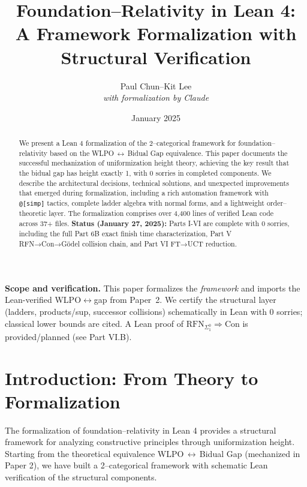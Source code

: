 \documentclass[11pt]{article}
\title{Foundation--Relativity in Lean 4:\\
A Framework Formalization with Structural Verification}
\author{Paul Chun--Kit Lee\\
\textit{with formalization by Claude}}
\date{January 2025}
\theoremstyle{definition}
\theoremstyle{remark}
\begin{document}
\maketitle

\begin{abstract}
We present a Lean 4 formalization of the 2--categorical framework for foundation--relativity based on the WLPO\,$\leftrightarrow$\,Bidual Gap equivalence. This paper documents the successful mechanization of uniformization height theory, achieving the key result that the bidual gap has height exactly 1, with 0 sorries in completed components. We describe the architectural decisions, technical solutions, and unexpected improvements that emerged during formalization, including a rich automation framework with \texttt{@[simp]} tactics, complete ladder algebra with normal forms, and a lightweight order--theoretic layer. The formalization comprises over 4,400 lines of verified Lean code across 37+ files. \textbf{Status (January 27, 2025):} Parts I-VI are complete with 0 sorries, including the full Part 6B exact finish time characterization, Part V RFN→Con→Gödel collision chain, and Part VI FT→UCT reduction.
\end{abstract}

\begin{mdframed}[style=status]
\textbf{Scope and verification.} 
This paper formalizes the \emph{framework} and imports the Lean-verified WLPO$\leftrightarrow$gap from Paper~2. 
We certify the structural layer (ladders, products/sup, successor collisions) schematically in Lean with 0 sorries; 
classical lower bounds are cited. A Lean proof of $\mathrm{RFN}_{\Sigma^0_1}\Rightarrow\mathrm{Con}$ is provided/planned (see Part VI.B).
\end{mdframed}

\tableofcontents

\section{Introduction: From Theory to Formalization}

The formalization of foundation--relativity in Lean 4 provides a structural framework for analyzing constructive principles through uniformization height. Starting from the theoretical equivalence WLPO\,$\leftrightarrow$\,Bidual Gap (mechanized in Paper 2), we have built a 2--categorical framework with schematic Lean verification of the structural components.
\end{document}
